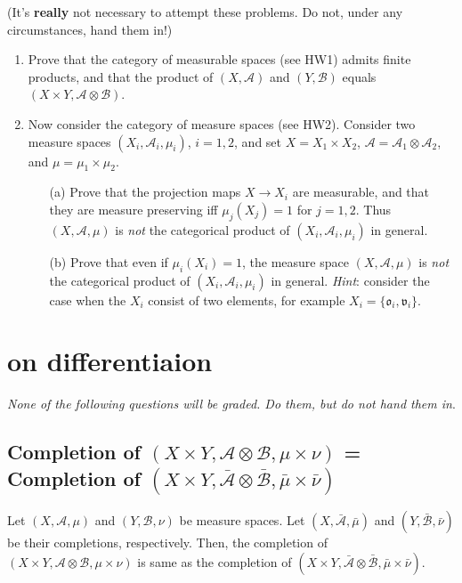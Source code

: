 \documentclass[lang=cn,11pt]{elegantbook}
\begin{document}
(It's \textbf{really} not necessary to attempt these problems. Do not, under any circumstances, hand them in!)
\begin{enumerate}
\item Prove that the category of measurable spaces (see HW1) admits finite products, and that the product of $(X,\mathcal{A})$ and $(Y,\mathcal{B})$ equals $(X\times Y,\mathcal{A}\otimes\mathcal{B})$. 
\item Now consider the category of measure spaces (see HW2). Consider two 
  measure spaces $(X_i,\mathcal{A}_i,\mu_i)$, $i=1,2$, and set $X=X_1\times X_2$, $\mathcal{A}=\mathcal{A}_1\otimes \mathcal{A}_2$, and $\mu=\mu_1\times\mu_2$.
  \begin{itemize}
  \item[(a)]Prove that the projection maps $X\to X_i$ are measurable, and that they are measure preserving iff $\mu_j(X_j)=1$ for $j=1,2$. Thus $(X,\mathcal{A},\mu)$ is \emph{not} the categorical product of $(X_i,\mathcal{A}_i,\mu_i)$ in general.
  \item[(b)]Prove that even if $\mu_i(X_i)=1$, the measure space $(X,\mathcal{A},\mu)$ is \emph{not} the categorical product of $(X_i,\mathcal{A}_i,\mu_i)$ in general.
    \textit{Hint}: consider the case when the $X_i$ consist of two elements, for example $X_i=\{\mathfrak{o}_i,\mathfrak{v}_i\}$.
  \end{itemize}
\end{enumerate}












\chapter{on differentiaion}

\begin{center}
\textit{None of the following questions will be graded. Do them, but do not hand them in}.
\end{center}



\section{Completion of $(X\times Y, \mathcal{A}\otimes \mathcal{B}, \mu\times \nu)$ = Completion of $(X\times Y, \bar{\mathcal{A}}\otimes \bar{\mathcal{B}}, \bar{\mu}\times \bar{\nu})$}
Let $(X, \mathcal{A}, \mu)$ and $(Y, \mathcal{B}, \nu)$ be measure spaces. Let $(X, \bar{\mathcal{A}}, \bar{\mu})$ and $(Y, \bar{\mathcal{B}}, \bar{\nu})$ be their completions, respectively. 
Then, the completion of $(X\times Y, \mathcal{A}\otimes \mathcal{B}, \mu\times \nu)$ is same as the completion of $(X\times Y, \bar{\mathcal{A}}\otimes \bar{\mathcal{B}}, \bar{\mu}\times \bar{\nu})$.
\end{document}
